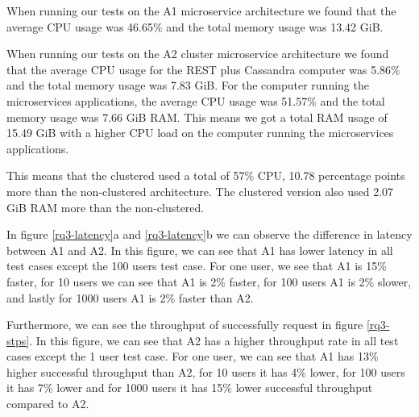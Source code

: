 \documentclass[a4paper,oneside]{bth}
\begin{document}
\par\vspace{0.5cm}
When running our tests on the A1 microservice architecture we found that the average CPU usage was 46.65\% and the total memory usage was 13.42 GiB.

\par\vspace {0.5cm}
When running our tests on the A2 cluster microservice architecture we found that the average CPU usage for the REST plus Cassandra computer was 5.86\% and the total memory usage was 7.83 GiB. For the computer running the microservices applications, the average CPU usage was 51.57\% and the total memory usage was 7.66 GiB RAM. This means we got a total RAM usage of 15.49 GiB with a higher CPU load on the computer running the microservices applications.

\par\vspace{0.5cm}
This means that the clustered used a total of 57\% CPU, 10.78 percentage points more than the non-clustered architecture. The clustered version also used 2.07 GiB RAM more than the non-clustered.

\par\vspace{0.5cm}
In figure \ref{rq3-latency}a and \ref{rq3-latency}b we can observe the difference in latency between A1 and A2. In this figure, we can see that A1 has lower latency in all test cases except the 100 users test case. For one user, we see that A1 is 15\% faster, for 10 users we can see that A1 is 2\% faster, for 100 users A1 is 2\% slower, and lastly for 1000 users A1 is 2\% faster than A2.

\par\vspace{0.5cm}
Furthermore, we can see the throughput of successfully request in figure \ref{rq3-stps}. In this figure, we can see that A2 has a higher throughput rate in all test cases except the 1 user test case. For one user, we can see that A1 has 13\% higher successful throughput than A2, for 10 users it has 4\% lower, for 100 users it has 7\% lower and for 1000 users it has 15\% lower successful throughput compared to A2.
\end{document}
